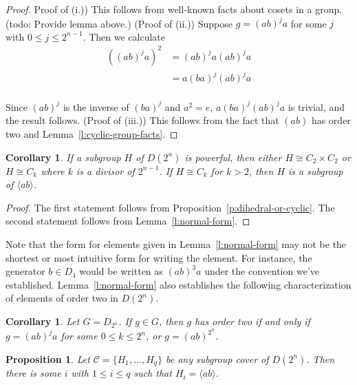 \documentclass{amsart}
\numberwithin{equation} {section}
\newtheorem{proposition}[equation]{Proposition}
\newtheorem{corollary}[equation]{Corollary}
\theoremstyle{definition}
\begin{document}
\begin{proof}
Proof of (i.)) This follows from well-known facts about cosets in a group. (todo: Provide lemma above.) 
(Proof of (ii.)) Suppose $g = (ab)^ja$ for some $j$ with $0 \leq j \leq 2^{n-1}$. Then we calculate
\begin{align*}
((ab)^j a)^2 &= (ab)^j a (ab)^j a \\
&= a (ba)^j (ab)^j a \\
\end{align*}

Since $(ab)^j$ is the inverse of $(ba)^j$ and $a^2 = e$,  $a (ba)^j (ab)^j a$ is trivial, and the result follows. (Proof of (iii.)) This follows from the fact that $(ab)$ has order two and Lemma~\ref{l:cyclic-group-facts}.
\end{proof}

\begin{corollary}\label{c:powerful-isomorphism-types} 
If a subgroup $H$ of $D(2^n)$ is powerful, then either $H\cong C_2\times C_2$ or $H\cong C_k$ where $k $ is a divisor of $2^{n-1}$. If $H \cong C_k$ for $k > 2$, then $H$ is a subgroup of $\langle ab \rangle$. 
\end{corollary}

\begin{proof}
The first statement follows from Proposition~\ref{p:dihedral-or-cyclic}. The second statement follows from Lemma~\ref{l:normal-form}. 
\end{proof} 


Note that the form for elements given in Lemma~\ref{l:normal-form} may not be the shortest or most intuitive form for writing the element. For instance, the generator $b \in D_4$ would be written as $(ab)^3a$ under the convention we've established. Lemma~\ref{l:normal-form} also establishes the following characterization of elements of order two in $D(2^n)$. 

\begin{corollary}\label{c:elements-of-order-two}
Let $G = D_{2^n}$. If $g \in G$, then $g$ has order two if and only if $g = (ab)^ja$ for some $0 \leq k \leq 2^n$, or $g = (ab)^{2^n}$. 
\end{corollary} 

\begin{proposition}\label{p:subgroup-cover-must-contain-maximal-cyclic}
Let $\mathcal{C} = \{H_1, \ldots, H_q \}$ be any subgroup cover of $D(2^n)$. Then there is some $i$ with $1 \leq i \leq q$ such that $H_i = \langle ab \rangle$.
\end{proposition}
\end{document}
